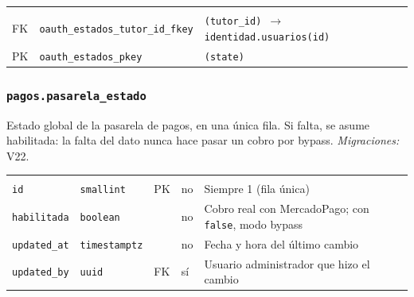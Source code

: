 {\small
\begin{xltabular}{\textwidth}{@{}>{\raggedright\arraybackslash}p{1.7cm} >{\raggedright\arraybackslash}p{4.6cm} L@{}}
    \toprule
     &  &  \\
    \midrule
    \endfirsthead
    \toprule
     &  &  \\
    \midrule
    \endhead
    \bottomrule
    \endfoot
    FK & \texttt{oauth\_\allowbreak{}estados\_\allowbreak{}tutor\_\allowbreak{}id\_\allowbreak{}fkey} & \texttt{(\allowbreak{}tutor\_\allowbreak{}id) $\rightarrow$ identidad.usuarios(\allowbreak{}id)} \\
    PK & \texttt{oauth\_\allowbreak{}estados\_\allowbreak{}pkey} & \texttt{(\allowbreak{}state)} \\
\end{xltabular}
}

\subsubsection{\texorpdfstring{\texttt{pagos.pasarela\_\allowbreak{}estado}}{pagos.pasarela\_estado}}\label{dd:pagos.pasarela_estado}

Estado global de la pasarela de pagos, en una única fila. Si falta, se asume habilitada: la falta del dato nunca hace pasar un cobro por bypass. \emph{Migraciones:} V22.

{\small
\begin{xltabular}{\textwidth}{@{}>{\raggedright\arraybackslash}p{3.6cm} >{\raggedright\arraybackslash}p{2.3cm} >{\raggedright\arraybackslash}p{1cm} >{\centering\arraybackslash}p{0.85cm} L@{}}
    \toprule
     &  &  &  &  \\
    \midrule
    \endfirsthead
    \toprule
     &  &  &  &  \\
    \midrule
    \endhead
    \bottomrule
    \endfoot
    \texttt{id} & \texttt{smallint} & PK & no & Siempre 1 (fila única) \\
    \texttt{habilitada} & \texttt{boolean} &  & no & Cobro real con MercadoPago; con \texttt{false}, modo bypass \\
    \texttt{updated\_\allowbreak{}at} & \texttt{timestamptz} &  & no & Fecha y hora del último cambio \\
    \texttt{updated\_\allowbreak{}by} & \texttt{uuid} & FK & sí & Usuario administrador que hizo el cambio \\
\end{xltabular}
}

